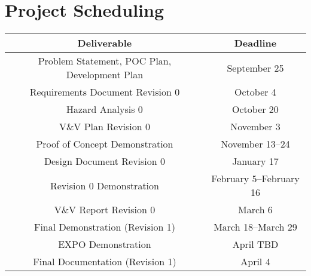 \documentclass{article}
\begin{document}
\section{Project Scheduling}

\begin{center}
\begin{tabular}{ |c|c| } 
\hline
\textbf{Deliverable} & \textbf{Deadline} \\ 
 \hline
 Problem Statement, POC Plan, Development Plan & September 25 \\ 
 Requirements Document Revision 0  & October 4 \\
Hazard Analysis 0 & October 20  \\ 
 V\&V Plan Revision 0 & November 3 \\ 
Proof of Concept Demonstration & November 13--24 \\
Design Document Revision 0 & January 17 \\
Revision 0 Demonstration & February 5--February 16\\
V\&V Report Revision 0 & March 6 \\
Final Demonstration (Revision 1) & March 18--March 29 \\
EXPO Demonstration & April TBD \\
Final Documentation (Revision 1) & April 4 \\
 \hline
\end{tabular}
\end{center}

\end{document}
